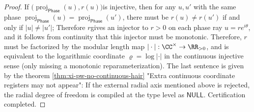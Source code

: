 \begin{proof}
If \(\bigl(\operatorname{proj}_{\mathsf{Phase}}(u),r(u)\bigr)\) ​​is injective, then for any \(u,u'\) with the same phase \(\operatorname{proj}_{\mathsf{Phase}}(u)=\operatorname{proj}_{\mathsf{Phase}}(u')\), there must be \(r(u)\neq r(u')\) if and only if \(|u|\neq |u'|\);
Therefore \(r\) ​​gives an injector to \(r>0\) on each phase ray \(u=re^{i\theta}\), and it follows from continuity that this injector must be monotonic.
Therefore, \(r\) ​​must be factorized by the modular length map \(|\cdot|:\CC^\times\to\RR_{>0}\), and is equivalent to the logarithmic coordinate \(\varrho=\log|\cdot|\) in the continuous injective sense (only missing a monotonic reparameterization).
The last sentence is given by the theorem \ref{thm:xi-pw-no-continuous-hair} "Extra continuous coordinate registers may not appear": If the external radial axis mentioned above is rejected, the radial degree of freedom is compiled at the type level as \(\mathsf{NULL}\). Certification completed.
\end{proof}

